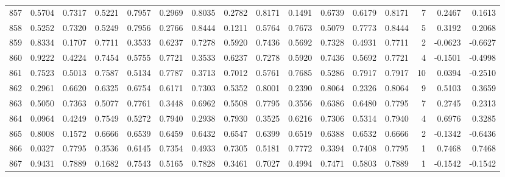 \begin{tabular}{lrrrrrrrrrrrrrrr}
857 &      0.5704 &  0.7317 &  0.5221 &  0.7957 &  0.2969 &  0.8035 &  0.2782 &  0.8171 &  0.1491 &  0.6739 &   0.6179 &     0.8171 &      7 &                    0.2467 &                     0.1613 \\
858 &      0.5252 &  0.7320 &  0.5249 &  0.7956 &  0.2766 &  0.8444 &  0.1211 &  0.5764 &  0.7673 &  0.5079 &   0.7773 &     0.8444 &      5 &                    0.3192 &                     0.2068 \\
859 &      0.8334 &  0.1707 &  0.7711 &  0.3533 &  0.6237 &  0.7278 &  0.5920 &  0.7436 &  0.5692 &  0.7328 &   0.4931 &     0.7711 &      2 &                   -0.0623 &                    -0.6627 \\
860 &      0.9222 &  0.4224 &  0.7454 &  0.5755 &  0.7721 &  0.3533 &  0.6237 &  0.7278 &  0.5920 &  0.7436 &   0.5692 &     0.7721 &      4 &                   -0.1501 &                    -0.4998 \\
861 &      0.7523 &  0.5013 &  0.7587 &  0.5134 &  0.7787 &  0.3713 &  0.7012 &  0.5761 &  0.7685 &  0.5286 &   0.7917 &     0.7917 &     10 &                    0.0394 &                    -0.2510 \\
862 &      0.2961 &  0.6620 &  0.6325 &  0.6754 &  0.6171 &  0.7303 &  0.5352 &  0.8001 &  0.2390 &  0.8064 &   0.2326 &     0.8064 &      9 &                    0.5103 &                     0.3659 \\
863 &      0.5050 &  0.7363 &  0.5077 &  0.7761 &  0.3448 &  0.6962 &  0.5508 &  0.7795 &  0.3556 &  0.6386 &   0.6480 &     0.7795 &      7 &                    0.2745 &                     0.2313 \\
864 &      0.0964 &  0.4249 &  0.7549 &  0.5272 &  0.7940 &  0.2938 &  0.7930 &  0.3525 &  0.6216 &  0.7306 &   0.5314 &     0.7940 &      4 &                    0.6976 &                     0.3285 \\
865 &      0.8008 &  0.1572 &  0.6666 &  0.6539 &  0.6459 &  0.6432 &  0.6547 &  0.6399 &  0.6519 &  0.6388 &   0.6532 &     0.6666 &      2 &                   -0.1342 &                    -0.6436 \\
866 &      0.0327 &  0.7795 &  0.3536 &  0.6145 &  0.7354 &  0.4933 &  0.7305 &  0.5181 &  0.7772 &  0.3394 &   0.7408 &     0.7795 &      1 &                    0.7468 &                     0.7468 \\
867 &      0.9431 &  0.7889 &  0.1682 &  0.7543 &  0.5165 &  0.7828 &  0.3461 &  0.7027 &  0.4994 &  0.7471 &   0.5803 &     0.7889 &      1 &                   -0.1542 &                    -0.1542 \\

\end{tabular}

